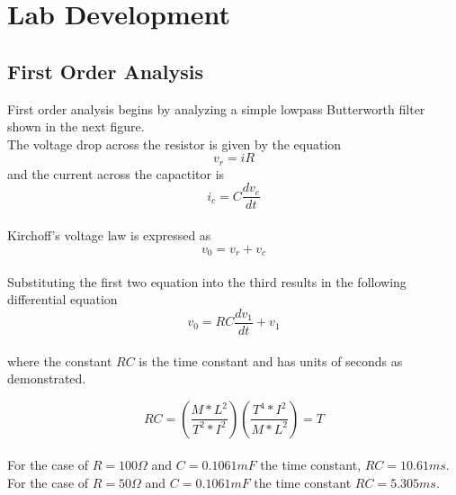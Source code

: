 \documentclass[main.tex]{subfiles}
\begin{document}
	\section[Lab Development]{Lab Development}
	\subsection[First Order Analysis]{First Order Analysis}
	
	First order analysis begins by analyzing a simple lowpass Butterworth filter shown in the next figure.
	\\
	The voltage drop across the resistor is given by the equation
	\[v_{r} = iR\] and the current across the capactitor is 
	\[i_{c} = C \frac{d v_{c}}{dt}\]
	\\Kirchoff's voltage law is expressed as
	\[v_{0} = v_{r} + v_{c}\]
	\\
	Substituting the first two equation into the third results in the following differential equation
	\[v_{0} = RC \frac{d v_{1}}{dt} + v_{1}\]
	\\where the constant \(RC\) is the time constant and has units of seconds as demonstrated.
	
	
	\[RC = (\frac{M * L^2}{T^2 * I^2} )(\frac{T^4 * I^2}{M * L^2}) = T\]
	\\
	For the case of \(R = 100\Omega\) and \(C = 0.1061 mF\) the time constant, \(RC = 10.61 ms\). For the case of \(R=50\Omega\) and \(C=0.1061mF\) the time constant \(RC=5.305ms\).
	
\end{document}
